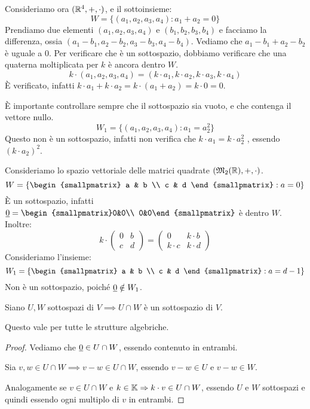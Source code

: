 Consideriamo ora $(\mathbb{R}^4, +, \cdot)$, e il sottoinsieme:
\[
W = \{ (a_1, a_2, a_3, a_4) : a_1 + a_2 = 0 \}
\]
Prendiamo due elementi $(a_1, a_2, a_3, a_4)$ e $(b_1, b_2, b_3, b_4)$ e facciamo la differenza, ossia $(a_1 - b_1, a_2 - b_2, a_3 - b_3, a_4 - b_4)$. Vediamo che $a_1 - b_1 + a_2 - b_2$ \`e uguale a 0. Per verificare che \`e un sottospazio, dobbiamo verificare che una quaterna moltiplicata per $k$ \`e ancora dentro $W$.
\[
k \cdot (a_1, a_2, a_3, a_4) = (k \cdot a_1, k \cdot a_2, k \cdot a_3, k \cdot a_4)
\]
\`E verificato, infatti $k \cdot a_1 + k \cdot a_2 = k \cdot (a_1 + a_2) = k \cdot 0 = 0$.

\`E importante controllare sempre che il sottospazio sia vuoto, e che contenga il vettore nullo.
\[
W_1 = \{ (a_1, a_2, a_3, a_4) : a_1 = a_2^2 \}
\]
Questo non \`e un sottospazio, infatti non verifica che $k \cdot a_1 = k \cdot a_2^2$ , essendo $(k \cdot a_2)^2$.

Consideriamo lo spazio vettoriale delle matrici quadrate $(\mathfrak{M}_2 (\mathbb{R}), +, \cdot)$.
\[
W = \left\{ 
\begin{smallpmatrix}
a & b  \\
c & d 
\end{smallpmatrix}
: a = 0 \right\}
\]
\`E un sottospazio, infatti $\nullelement = \begin{smallpmatrix}0&0\\ 0&0\end{smallpmatrix} $ \`e dentro $W$. Inoltre:
\[
k \cdot 
\begin{pmatrix}
0 & b \\
c & d
\end{pmatrix}
=
\begin{pmatrix}
0 & k \cdot b \\ 
k \cdot c & k \cdot d
\end{pmatrix}
\]
Consideriamo l'insieme:
\[
W_1 = \left\{
\begin{smallpmatrix}
a & b \\
c & d 
\end{smallpmatrix}
: a = d - 1 \right\} 
\]
Non \`e un sottospazio, poich\'e $\underline{0} \notin W_1$.

\begin{prop}
Siano $U, W$ sottospazi di $V \implies U \cap W$ \`e un sottospazio di $V$.
\end{prop}
Questo vale per tutte le strutture algebriche.

\begin{proof}
Vediamo che $\underline{0} \in U \cap W$, essendo contenuto in entrambi.

Sia $v, w \in U \cap W \implies v - w \in U \cap W$, essendo $v - w \in U$ e $v - w \in W$.

Analogamente se $v \in U \cap W$ e $k \in \mathbb{K} \Rightarrow k \cdot v \in U \cap W$, essendo $U$ e $W$ sottospazi e quindi essendo ogni multiplo di $v$ in entrambi.
\end{proof}

